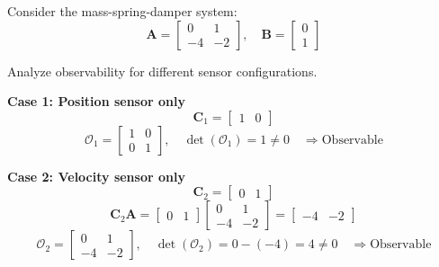 \begin{example}
\label{ex:observability_sensors}
Consider the mass-spring-damper system:
\begin{equation}
\mathbf{A} = \begin{bmatrix} 0 & 1 \\ -4 & -2 \end{bmatrix}, \quad \mathbf{B} = \begin{bmatrix} 0 \\ 1 \end{bmatrix}
\end{equation}

Analyze observability for different sensor configurations.

\textbf{Case 1: Position sensor only}
\begin{equation}
\mathbf{C}_1 = \begin{bmatrix} 1 & 0 \end{bmatrix}
\end{equation}
\begin{equation}
\mathcal{O}_1 = \begin{bmatrix} 1 & 0 \\ 0 & 1 \end{bmatrix}, \quad \det(\mathcal{O}_1) = 1 \neq 0 \quad \Rightarrow \text{Observable}
\end{equation}

\textbf{Case 2: Velocity sensor only}
\begin{equation}
\mathbf{C}_2 = \begin{bmatrix} 0 & 1 \end{bmatrix}
\end{equation}
\begin{equation}
\mathbf{C}_2\mathbf{A} = \begin{bmatrix} 0 & 1 \end{bmatrix}\begin{bmatrix} 0 & 1 \\ -4 & -2 \end{bmatrix} = \begin{bmatrix} -4 & -2 \end{bmatrix}
\end{equation}
\begin{equation}
\mathcal{O}_2 = \begin{bmatrix} 0 & 1 \\ -4 & -2 \end{bmatrix}, \quad \det(\mathcal{O}_2) = 0 - (-4) = 4 \neq 0 \quad \Rightarrow \text{Observable}
\end{equation}


\end{example}
